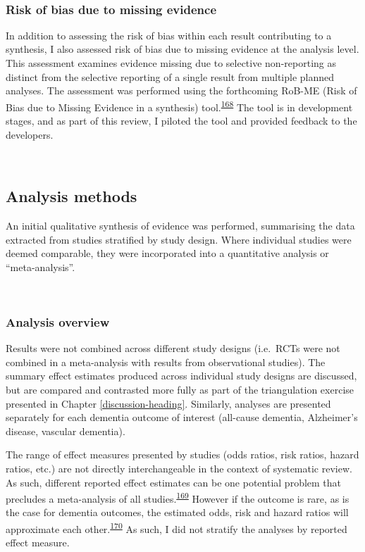 \documentclass[a4paper, twoside]{templates/ociamthesis}
\begin{document}
~

\hypertarget{methods-rob-me}{%
\subsubsection{Risk of bias due to missing evidence}\label{methods-rob-me}}

In addition to assessing the risk of bias within each result contributing to a synthesis, I also assessed risk of bias due to missing evidence at the analysis level. This assessment examines evidence missing due to selective non-reporting as distinct from the selective reporting of a single result from multiple planned analyses. The assessment was performed using the forthcoming RoB-ME (Risk of Bias due to Missing Evidence in a synthesis) tool.\textsuperscript{\protect\hyperlink{ref-zotero-15123}{168}} The tool is in development stages, and as part of this review, I piloted the tool and provided feedback to the developers.

~

\hypertarget{analysis-methods}{%
\subsection{Analysis methods}\label{analysis-methods}}

An initial qualitative synthesis of evidence was performed, summarising the data extracted from studies stratified by study design. Where individual studies were deemed comparable, they were incorporated into a quantitative analysis or ``meta-analysis''.

~

\hypertarget{sys-rev-analysis-overview}{%
\subsubsection{Analysis overview}\label{sys-rev-analysis-overview}}

Results were not combined across different study designs (i.e.~RCTs were not combined in a meta-analysis with results from observational studies). The summary effect estimates produced across individual study designs are discussed, but are compared and contrasted more fully as part of the triangulation exercise presented in Chapter \ref{discussion-heading}. Similarly, analyses are presented separately for each dementia outcome of interest (all-cause dementia, Alzheimer's disease, vascular dementia).

The range of effect measures presented by studies (odds ratios, risk ratios, hazard ratios, etc.) are not directly interchangeable in the context of systematic review. As such, different reported effect estimates can be one potential problem that precludes a meta-analysis of all studies.\textsuperscript{\protect\hyperlink{ref-mckenzie2019}{169}} However if the outcome is rare, as is the case for dementia outcomes, the estimated odds, risk and hazard ratios will approximate each other.\textsuperscript{\protect\hyperlink{ref-vanderweele2020}{170}} As such, I did not stratify the analyses by reported effect measure.
\end{document}
